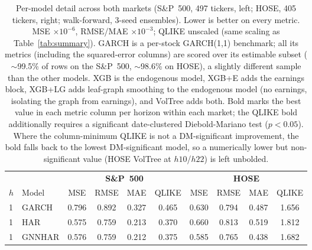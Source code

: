\documentclass[runningheads]{llncs}
\begin{document}
\begin{table}[t]
\centering
\caption{Per-model detail across both markets (S\&P~500, 497 tickers, left; HOSE, 405 tickers, right;
walk-forward, 3-seed ensembles). Lower is better on every metric. MSE $\times10^{-6}$, RMSE/MAE
$\times10^{-3}$; QLIKE unscaled (same scaling as Table~\ref{tab:summary}). GARCH is a per-stock
GARCH(1,1) benchmark; all its metrics (including the squared-error columns) are scored over its
estimable subset ($\sim$99.5\% of rows on the S\&P~500, $\sim$98.6\% on HOSE), a slightly different
sample than the other models. XGB is the endogenous model, XGB+E adds the earnings block, XGB+LG adds leaf-graph smoothing to the
endogenous model (no earnings, isolating the graph from earnings), and VolTree adds both. Bold marks the
best value in each metric column per horizon within
each market; the QLIKE bold additionally requires a significant date-clustered Diebold-Mariano test
($p<0.05$). Where the column-minimum QLIKE is not a DM-significant improvement, the bold falls back to the
lowest DM-significant model, so a numerically lower but non-significant value (HOSE VolTree at $h10$/$h22$)
is left unbolded.}
\label{tab:detail}
\footnotesize
\setlength{\tabcolsep}{3pt}
\begin{tabular}{ll cccc cccc}
\toprule
& & \multicolumn{4}{c}{\textbf{S\&P~500}} & \multicolumn{4}{c}{\textbf{HOSE}} \\
\cmidrule(lr){3-6}\cmidrule(lr){7-10}
$h$ & Model & MSE & RMSE & MAE & QLIKE & MSE & RMSE & MAE & QLIKE \\
\midrule
1 & GARCH    & 0.796 & 0.892 & 0.327 & 0.465 & 0.630 & 0.794 & 0.487 & 1.656 \\ %
1 & HAR      & 0.575 & 0.759 & 0.213 & 0.370 & 0.660 & 0.813 & 0.519 & 1.812 \\ %
1 & GNNHAR   & 0.576 & 0.759 & 0.212 & 0.375 & 0.585 & 0.765 & 0.438 & 1.682 \\ %

\end{tabular}
\end{table}
\end{document}
